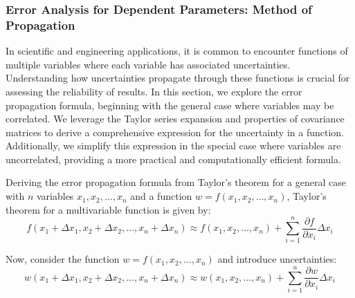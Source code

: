 \documentclass{article}
\begin{document}
\subsubsection{Error Analysis for Dependent Parameters: Method of Propagation}
In scientific and engineering applications, it is common to encounter functions of multiple variables where each variable has associated uncertainties. Understanding how uncertainties propagate through these functions is crucial for assessing the reliability of results. In this section, we explore the error propagation formula, beginning with the general case where variables may be correlated. We leverage the Taylor series expansion and properties of covariance matrices to derive a comprehensive expression for the uncertainty in a function. Additionally, we simplify this expression in the special case where variables are uncorrelated, providing a more practical and computationally efficient formula.



Deriving the error propagation formula from Taylor's theorem for a general case with \( n \) variables \( x_1, x_2, \ldots, x_n \) and a function \( w = f(x_1, x_2, \ldots, x_n) \), Taylor's theorem for a multivariable function is given by\cite{taylor2022introduction}\cite{LUO201723}:
\begin{equation}
f(x_1 + \Delta x_1, x_2 + \Delta x_2, \ldots, x_n + \Delta x_n) \approx f(x_1, x_2, \ldots, x_n) + \sum_{i=1}^{n} \frac{\partial f}{\partial x_i} \Delta x_i
\end{equation}

Now, consider the function \( w = f(x_1, x_2, \ldots, x_n) \) and introduce uncertainties:
\begin{equation}
w(x_1 + \Delta x_1, x_2 + \Delta x_2, \ldots, x_n + \Delta x_n) \approx w(x_1, x_2, \ldots, x_n) + \sum_{i=1}^{n} \frac{\partial w}{\partial x_i} \Delta x_i
\end{equation}
\end{document}
